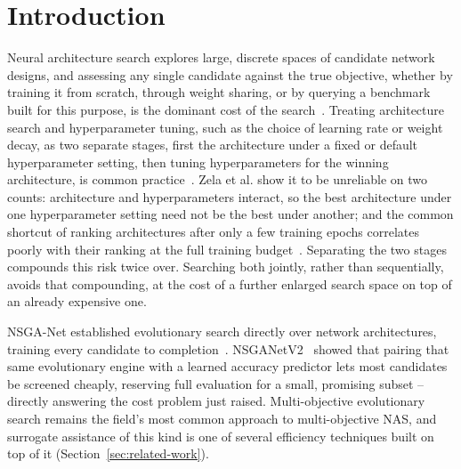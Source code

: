 \section{Introduction}
\label{sec:introduction}

Neural architecture search explores large, discrete spaces of candidate network designs, and assessing any single candidate against the true objective, whether by training it from scratch, through weight sharing, or by querying a benchmark built for this purpose, is the dominant cost of the search~\citep{white2023insights,liu2023survey}. Treating architecture search and hyperparameter tuning, such as the choice of learning rate or weight decay, as two separate stages, first the architecture under a fixed or default hyperparameter setting, then tuning hyperparameters for the winning architecture, is common practice~\citep{lu2019nsganet,lu2020nsganetv2}. Zela et al. show it to be unreliable on two counts: architecture and hyperparameters interact, so the best architecture under one hyperparameter setting need not be the best under another; and the common shortcut of ranking architectures after only a few training epochs correlates poorly with their ranking at the full training budget~\citep{zela2018towards}. Separating the two stages compounds this risk twice over. Searching both jointly, rather than sequentially, avoids that compounding, at the cost of a further enlarged search space on top of an already expensive one.

NSGA-Net established evolutionary search directly over network architectures, training every candidate to completion~\citep{lu2019nsganet}. NSGANetV2~\citep{lu2020nsganetv2} showed that pairing that same evolutionary engine with a learned accuracy predictor lets most candidates be screened cheaply, reserving full evaluation for a small, promising subset -- directly answering the cost problem just raised. Multi-objective evolutionary search remains the field's most common approach to multi-objective NAS, and surrogate assistance of this kind is one of several efficiency techniques built on top of it (Section~\ref{sec:related-work}).

